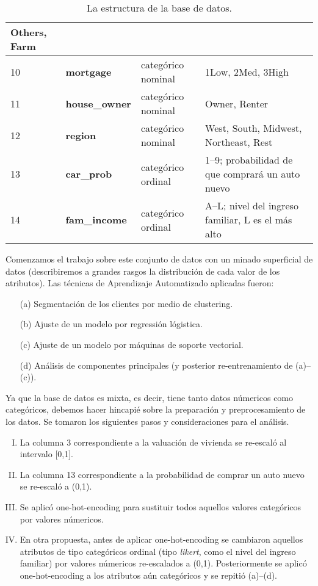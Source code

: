 \documentclass[twocolumn, letterpaper,11pt]{article}
\begin{document}
\begin{table}
\begin{center}
{\begin{tabular}{|p{1.6cm}|p{2.2cm}|p{3.3cm}|p{8cm}|}
       Others, Farm\\
    \hline 
    10 &\bf\small  mortgage & categórico nominal & 1Low, 2Med,  3High\\
    \hline 
    11 &\bf\small house\_owner & categórico nominal & Owner, Renter \\
    \hline 
    12 &\bf\small region & categórico nominal & West, South, Midwest, Northeast, Rest\\
    \hline 
    13 &\bf\small car\_prob & categórico ordinal & 1--9; probabilidad de que comprará un auto nuevo\\
    \hline 
    14 &\bf\small fam\_income & categórico ordinal & A--L; nivel del ingreso familiar, L es el más alto\\
    \hline
\end{tabular}}
\end{center}
\caption{\small La estructura de la base de datos.}
\label{tab:1}
\end{table}

\vspace{\baselineskip}
Comenzamos el trabajo sobre este conjunto de datos con un minado superficial de datos (describiremos a grandes rasgos
la distribución de cada valor de los atributos). Las técnicas de Aprendizaje Automatizado aplicadas fueron: 

\begin{itemize}
    \item[(a)] Segmentación de los clientes por medio de clustering.
    \item[(b)]  Ajuste de un modelo por regressión lógistica. 
    \item[(c)] Ajuste de un modelo por máquinas de soporte vectorial.
    \item[(d)] Análisis de componentes principales (y posterior re-entrenamiento de (a)--(c)). 
\end{itemize}


Ya que la base de datos es mixta, es decir, tiene tanto datos númericos como categóricos,
debemos hacer hincapié sobre la preparación y preprocesamiento de los
datos. Se tomaron los siguientes pasos y consideraciones para el análisis. 

\begin{enumerate}[I.]
    \item La columna 3 correspondiente a la valuación de vivienda se re-escaló al intervalo [0,1]. 
    \item La columna 13 correspondiente a la probabilidad de comprar un auto nuevo se re-escaló a (0,1). 
    \item Se aplicó one-hot-encoding para sustituir todos aquellos valores categóricos por valores númericos. 
    \item En otra propuesta, antes de aplicar one-hot-encoding se cambiaron aquellos atributos de tipo categóricos
        ordinal (tipo \emph{likert}, como el nivel del ingreso familiar) por valores númericos re-escalados a (0,1).
        Posteriormente se aplicó one-hot-encoding a los atributos aún categóricos y se repitió (a)--(d).
\end{enumerate}
\end{document}
